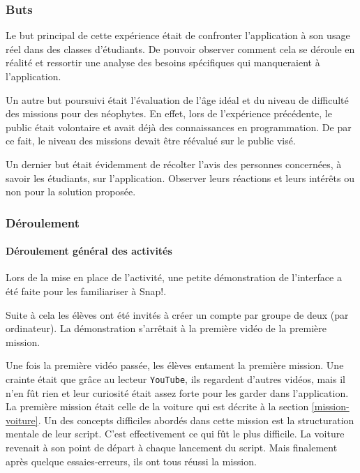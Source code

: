 \subsubsection{Buts}
Le but principal de cette expérience était de confronter l'application à son usage réel dans des classes d'étudiants. De pouvoir observer comment cela se déroule en réalité et ressortir une analyse des besoins spécifiques qui manqueraient à l'application.

Un autre but poursuivi était l'évaluation de l'âge idéal et du niveau de difficulté des missions pour des néophytes. En effet, lors de l'expérience précédente, le public était volontaire et avait déjà des connaissances en programmation. De par ce fait, le niveau des missions devait être réévalué sur le public visé.

Un dernier but était évidemment de récolter l'avis des personnes concernées, à savoir les étudiants, sur l'application. Observer leurs réactions et leurs intérêts ou non pour la solution proposée.

\subsubsection{Déroulement}
\paragraph{Déroulement général des activités}
Lors de la mise en place de l'activité, une petite démonstration de l'interface a été faite pour les familiariser à Snap!. 

Suite à cela les élèves ont été invités à créer un compte par groupe de deux (par ordinateur). La démonstration s'arrêtait à la première vidéo de la première mission.

Une fois la première vidéo passée, les élèves entament la première mission. Une crainte était que grâce au lecteur \texttt{YouTube}, ils regardent d'autres vidéos, mais il n'en fût rien et leur curiosité était assez forte pour les garder dans l'application.\\

La première mission était celle de la voiture qui est décrite à la section \ref{mission-voiture}. Un des concepts difficiles abordés dans cette mission est la structuration mentale de leur script. C'est effectivement ce qui fût le plus difficile. La voiture revenait à son point de départ à chaque lancement du script. Mais finalement après quelque essaies-erreurs, ils ont tous réussi la mission.\\


